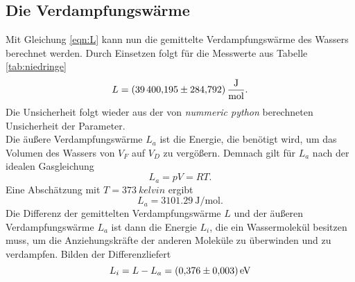 \subsection{Die Verdampfungswärme}
Mit Gleichung \eqref{eqn:L} kann nun die gemittelte Verdampfungswärme des Wassers berechnet werden.
Durch Einsetzen folgt für die Messwerte aus Tabelle \ref{tab:niedringe}
\begin{equation}
  L=\SI{39400.195\pm284.792}{\joule\per\mole}.
\end{equation}
Die Unsicherheit folgt wieder aus der von \textit{nummeric python} berechneten Unsicherheit der Parameter.
\\
Die äußere Verdampfungswärme $L_a$ ist die Energie, die benötigt wird, um das Volumen des Wassers von
$V_F$ auf $V_D$ zu vergößern. Demnach gilt für $L_a$ nach der idealen Gasgleichung
\begin{equation}
  L_a=pV=RT.
\end{equation}
Eine Abschätzung mit $T=\SI{373}{kelvin}$ ergibt
\begin{equation}
  L_a=\SI{3101.29}{\joule\per\mole}.
\end{equation}
Die Differenz der gemittelten Verdampfungswärme $L$ und der äußeren Verdampfungswärme $L_a$ ist dann 
die Energie $L_i$, die ein Wassermolekül besitzen muss, um die Anziehungskräfte der anderen Moleküle zu überwinden
und zu verdampfen. Bilden der Differenzliefert
\begin{equation}
  L_i=L-L_a=\SI{0.376 \pm 0.003}{\electronvolt}
\end{equation}

